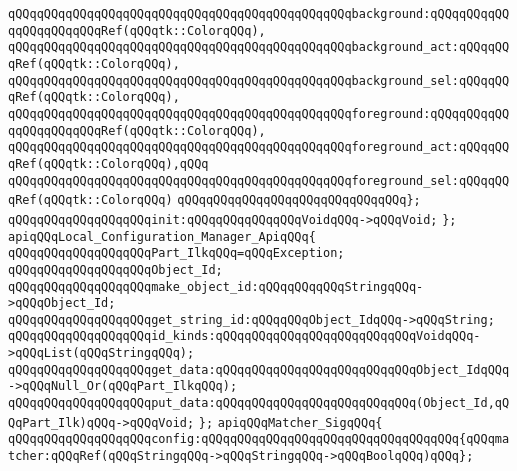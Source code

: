 \verb|qQQqqQQqqQQqqQQqqQQqqQQqqQQqqQQqqQQqqQQqqQQqqQQqbackground:qQQqqQQqqQQqqQQqqQQqqQQqRef(qQQqtk::ColorqQQq),|\newline
\verb|qQQqqQQqqQQqqQQqqQQqqQQqqQQqqQQqqQQqqQQqqQQqqQQqbackground_act:qQQqqQQqRef(qQQqtk::ColorqQQq),|\newline
\verb|qQQqqQQqqQQqqQQqqQQqqQQqqQQqqQQqqQQqqQQqqQQqqQQqbackground_sel:qQQqqQQqRef(qQQqtk::ColorqQQq),|\newline
\verb|qQQqqQQqqQQqqQQqqQQqqQQqqQQqqQQqqQQqqQQqqQQqqQQqforeground:qQQqqQQqqQQqqQQqqQQqqQQqRef(qQQqtk::ColorqQQq),|\newline
\verb|qQQqqQQqqQQqqQQqqQQqqQQqqQQqqQQqqQQqqQQqqQQqqQQqforeground_act:qQQqqQQqRef(qQQqtk::ColorqQQq),qQQq|\newline
\verb|qQQqqQQqqQQqqQQqqQQqqQQqqQQqqQQqqQQqqQQqqQQqqQQqforeground_sel:qQQqqQQqRef(qQQqtk::ColorqQQq)|\newline
\verb|qQQqqQQqqQQqqQQqqQQqqQQqqQQqqQQq};|\newline
\verb|qQQqqQQqqQQqqQQqqQQqinit:qQQqqQQqqQQqqQQqVoidqQQq->qQQqVoid;|\newline
\verb|};|\newline
\newline
\verb|apiqQQqLocal_Configuration_Manager_ApiqQQq{|\newline
\newline
\verb|qQQqqQQqqQQqqQQqqQQqPart_IlkqQQq=qQQqException;|\newline
\verb|qQQqqQQqqQQqqQQqqQQqObject_Id;|\newline
\verb|qQQqqQQqqQQqqQQqqQQqmake_object_id:qQQqqQQqqQQqStringqQQq->qQQqObject_Id;|\newline
\verb|qQQqqQQqqQQqqQQqqQQqget_string_id:qQQqqQQqObject_IdqQQq->qQQqString;|\newline
\verb|qQQqqQQqqQQqqQQqqQQqid_kinds:qQQqqQQqqQQqqQQqqQQqqQQqqQQqVoidqQQq->qQQqList(qQQqStringqQQq);|\newline
\verb|qQQqqQQqqQQqqQQqqQQqget_data:qQQqqQQqqQQqqQQqqQQqqQQqqQQqObject_IdqQQq->qQQqNull_Or(qQQqPart_IlkqQQq);|\newline
\verb|qQQqqQQqqQQqqQQqqQQqput_data:qQQqqQQqqQQqqQQqqQQqqQQqqQQq(Object_Id,qQQqPart_Ilk)qQQq->qQQqVoid;|\newline
\verb|};|\newline
\newline
\newline
\verb|apiqQQqMatcher_SigqQQq{|\newline
\newline
\verb|qQQqqQQqqQQqqQQqqQQqconfig:qQQqqQQqqQQqqQQqqQQqqQQqqQQqqQQqqQQq{qQQqmatcher:qQQqRef(qQQqStringqQQq->qQQqStringqQQq->qQQqBoolqQQq)qQQq};|\newline
